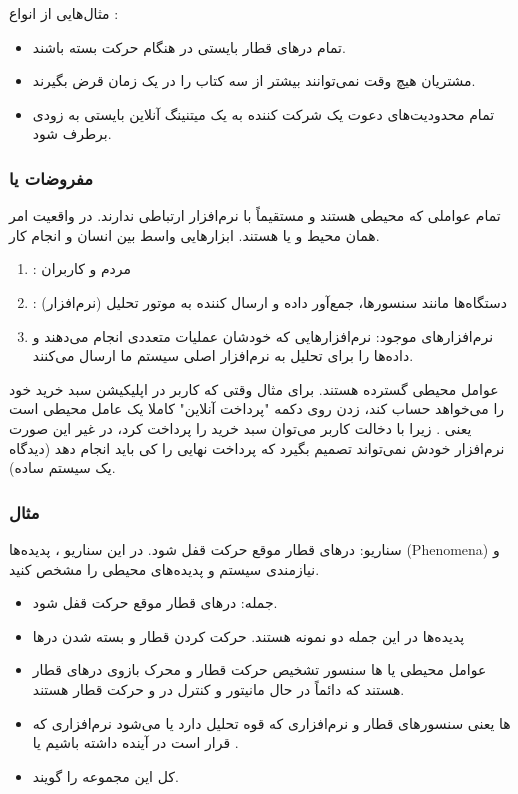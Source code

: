 مثال‌هایی از انواع :

\begin{itemize}
    \item تمام در‌های قطار بایستی در هنگام حرکت بسته باشند.
    \item مشتریان هیچ وقت نمی‌توانند بیشتر از سه کتاب را در یک زمان قرض بگیرند.
    \item تمام محدودیت‌های دعوت یک شرکت کننده به یک میتنینگ آنلاین بایستی به
    زودی برطرف شود.
\end{itemize}

\subsubsection{مفروضات یا }

تمام عواملی که محیطی هستند و مستقیماً با نرم‌افزار ارتباطی ندارند. در واقعیت امر
همان محیط و یا  هستند. ابزار‌هایی واسط بین انسان و انجام کار.

\begin{enumerate}
    \item {}: مردم و کاربران
    \item {}: دستگاه‌ها مانند سنسور‌ها، جمع‌آور داده و ارسال کننده به
    موتور تحلیل (نرم‌افزار)
    \item {} نرم‌افزار‌های موجود: نرم‌افزار‌هایی که خودشان
    عملیات متعددی انجام می‌دهند و داده‌ها را برای تحلیل به نرم‌افزار اصلی سیستم
    ما ارسال می‌کنند.
\end{enumerate}

عوامل محیطی گسترده هستند. برای مثال وقتی که کاربر در اپلیکیشن سبد خرید خود را
می‌خواهد حساب کند، زدن روی دکمه "پرداخت آنلاین" کاملا یک عامل محیطی است یعنی
. زیرا با دخالت کاربر می‌توان سبد خرید را پرداخت کرد، در غیر این
صورت نرم‌افزار خودش نمی‌تواند تصمیم بگیرد که پرداخت نهایی را کی باید انجام دهد
(دیدگاه یک سیستم ساده).

\subsubsection{مثال}

سناریو: در‌های قطار موقع حرکت قفل شود. در این سناریو ، پدیده‌ها
(Phenomena) و نیازمندی سیستم و پدیده‌های محیطی را مشخص کنید.

\begin{itemize}
    \item جمله: در‌های قطار موقع حرکت قفل شود.
    \item پدیده‌ها در این جمله دو نمونه هستند. حرکت کردن قطار و بسته شدن در‌ها
    \item عوامل محیطی یا ها سنسور تشخیص حرکت قطار و محرک بازوی
    در‌های قطار هستند که دائماً در حال مانیتور و کنترل در‌ و حرکت قطار هستند.
    \item {}ها یعنی سنسور‌های قطار و نرم‌افزاری که قوه تحلیل دارد
    یا  می‌شود نرم‌افزاری که قرار است در آینده داشته
    باشیم یا .
    \item کل این مجموعه را  گویند.
\end{itemize}

